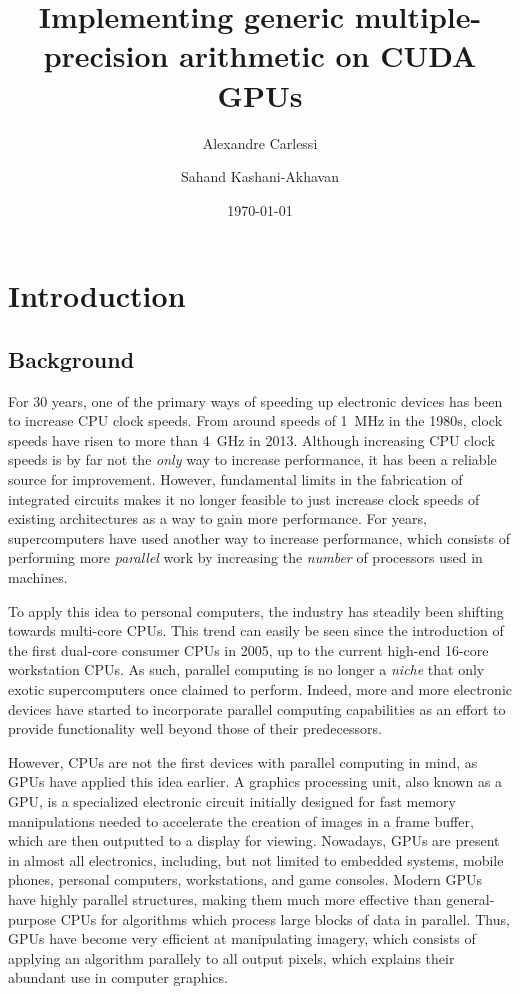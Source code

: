 \documentclass[12pt, a4paper]{report}
\begin{document}
\title{Implementing generic multiple-precision arithmetic on CUDA GPUs}
\author{Alexandre Carlessi \and Sahand Kashani-Akhavan}
\date{\today}




\tableofcontents

\chapter{Introduction}
\section{Background}
For 30 years, one of the primary ways of speeding up electronic devices has been
to increase CPU clock speeds.
From around speeds of 1~MHz in the 1980s, clock speeds have risen to more than
4~GHz in 2013.
Although increasing CPU clock speeds is by far not the \emph{only} way to
increase performance, it has been a reliable source for improvement.
However, fundamental limits in the fabrication of integrated circuits makes it
no longer feasible to just increase clock speeds of existing architectures as a
way to gain more performance.
For years, supercomputers have used another way to increase performance, which
consists of performing more \emph{parallel} work by increasing the \emph{number}
of processors used in machines.

To apply this idea to personal computers, the industry has steadily been
shifting towards multi-core CPUs.
This trend can easily be seen since the introduction of the first dual-core
consumer CPUs in 2005, up to the current high-end 16-core workstation CPUs.
As such, parallel computing is no longer a \emph{niche} that only exotic
supercomputers once claimed to perform.
Indeed, more and more electronic devices have started to incorporate parallel
computing capabilities as an effort to provide functionality well beyond those
of their predecessors.

However, CPUs are not the first devices with parallel computing in mind, as GPUs
have applied this idea earlier.
A graphics processing unit, also known as a GPU, is a specialized electronic
circuit initially designed for fast memory manipulations needed to accelerate
the creation of images in a frame buffer, which are then outputted to a display
for viewing.
Nowadays, GPUs are present in almost all electronics, including, but not limited
to embedded systems, mobile phones, personal computers, workstations, and game
consoles.
Modern GPUs have highly parallel structures, making them much more effective
than general-purpose CPUs for algorithms which process large blocks of data in
parallel.
Thus, GPUs have become very efficient at manipulating imagery, which consists
of applying an algorithm parallely to all output pixels, which explains their
abundant use in computer graphics.
\end{document}
